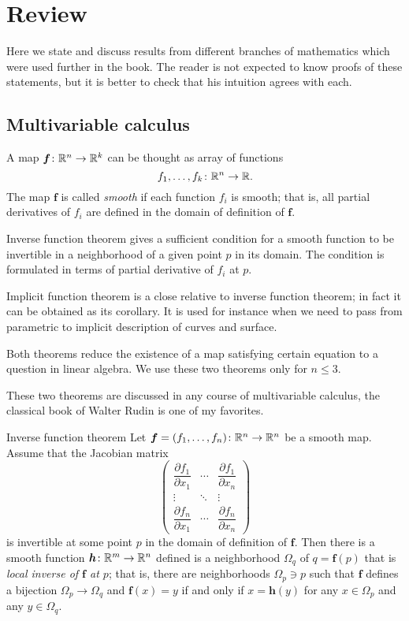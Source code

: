 \chapter{Review}

Here we state and discuss results from different branches of mathematics which were used further in the book.
The reader is not expected to know proofs of these statements, but it is better to check that his intuition agrees with each.  

\section*{Multivariable calculus}

A map $\bm{f}\colon\mathbb{R}^n\to\mathbb{R}^k$ can be thought as array of functions 
\[f_1,\dots,f_k\colon\mathbb{R}^n\to \mathbb{R}.\]
The map $\bm{f}$ is called \emph{smooth} if each function $f_i$ is smooth;
that is, all partial derivatives of $f_i$ are defined in the domain of definition of $\bm{f}$.

Inverse function theorem gives a sufficient condition for a smooth function to be invertible in a neighborhood of a given point $p$ in its domain.
The condition is formulated in terms of partial derivative of $f_i$ at $p$.

Implicit function theorem is a close relative to inverse function theorem;
in fact it can be obtained as its corollary.
It is used for instance when we need to pass from parametric to implicit description of curves and surface.

Both theorems reduce the existence of a map satisfying certain equation to a question in linear algebra. 
We use these two theorems only for $n\le 3$.

These two theorems are discussed in any course of multivariable calculus, the classical book of Walter Rudin \cite{rudin} is one of my favorites.

\begin{thm}{Inverse function theorem}\label{thm:inverse}
Let $\bm{f}=(f_1,\dots,f_n)\colon\mathbb{R}^n\to\mathbb{R}^n$ be a smooth map.
Assume that the Jacobian matrix
\[
\begin{pmatrix}
\dfrac{\partial f_1}{\partial x_1} & \cdots & \dfrac{\partial f_1}{\partial x_n}\\
\vdots & \ddots & \vdots\\
\dfrac{\partial f_n}{\partial x_1} & \cdots & \dfrac{\partial f_n}{\partial x_n} \end{pmatrix}\]
is invertible at some point $p$ in the domain of definition of $\bm{f}$.
Then there is a smooth function $\bm{h}\colon\mathbb{R}^m\to\mathbb{R}^n$ defined is a neighborhood $\Omega_q$ of $q=\bm{f}(p)$ that is \emph{local inverse of $\bm{f}$ at $p$};
that is, there are neighborhoods $\Omega_p\ni p$ such that
$\bm{f}$ defines a bijection $\Omega_p\to \Omega_q$ and
$\bm{f}(x)=y$ if and only if $x=\bm{h}(y)$ for any $x\in \Omega_p$ and any $y\in \Omega_q$.
\end{thm}

